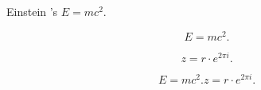 \documentclass{article}
\begin{document}
Einstein 's $E=mc^2$.

\[ E=mc^2. \]

\[ z = r\cdot e^{2\pi i}. \]

\begin{equation}
E=mc^2.

z = r\cdot e^{2\pi i}. 
\end{equation}
\end{document}
